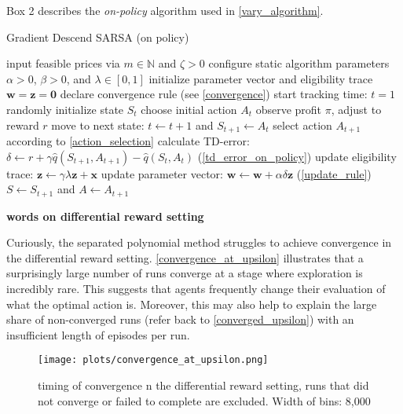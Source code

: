 \pagebreak

Box 2 describes the \emph{on-policy} algorithm used in \autoref{vary_algorithm}.

\begin{algorithm}
	\caption{Gradient Descend SARSA (on policy)}
	\begin{algorithmic}[]
		\label{SARSA}
		\small
		\STATE input feasible prices via $m \in \mathbb{N}$ and $\zeta > 0$
		\STATE configure static algorithm parameters $\alpha > 0$, $\beta > 0$, and $\lambda \in [0, 1]$
		\STATE initialize parameter vector and eligibility trace $\boldsymbol{w} = \boldsymbol{z} = \boldsymbol{0}$
		\STATE declare convergence rule (see \autoref{convergence})
		\STATE start tracking time: $t = 1$
		\STATE randomly initialize state $S_t$
		\STATE choose initial action $A_t$
		\STATE observe profit $\pi$, adjust to reward $r$
		\STATE move to next state: $t \leftarrow t+1$ and $S_{t+1} \leftarrow A_t$
		\STATE select action $A_{t+1}$ according to \autoref{action_selection}
		\STATE calculate TD-error: $\delta \leftarrow r + \gamma \hat{q}(S_{t+1}, A_{t+1}) - \hat{q}(S_t, A_t)$ (\autoref{td_error_on_policy})
		\STATE update eligibility trace: $\boldsymbol{z} \leftarrow \gamma \lambda \boldsymbol{z} + \boldsymbol{x}$
		\STATE update parameter vector: $\boldsymbol{w} \leftarrow \boldsymbol{w} + \alpha  \delta  \boldsymbol{z}$ (\autoref{update_rule})
		\STATE $S \leftarrow S_{t+1}$ and $A \leftarrow A_{t+1}$
		\ENDWHILE
	\end{algorithmic}
\end{algorithm}




\textbf{words on differential reward setting}

Curiously, the separated polynomial method struggles to achieve convergence in the differential reward setting. \autoref{convergence_at_upsilon} illustrates that a surprisingly large number of runs converge at a stage where exploration is incredibly rare. This suggests that agents frequently change their evaluation of what the optimal action is. Moreover, this may also help to explain the large share of non-converged runs (refer back to \autoref{converged_upsilon}) with an insufficient length of episodes per run.

\begin{figure}
	\texttt{[image: plots/convergence\_at\_upsilon.png]}
	\caption{timing of convergence n the differential reward setting, runs that did not converge or failed to complete are excluded. Width of bins: 8,000}
	\label{convergence_at_upsilon}
\end{figure}


